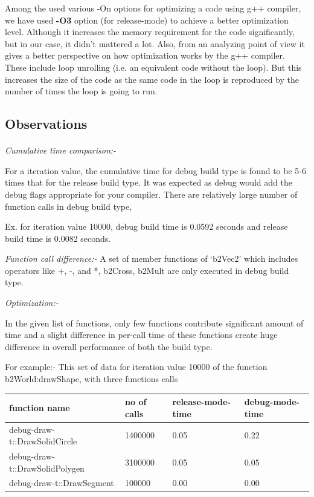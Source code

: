 \documentclass[11pt]{article}
\begin{document}
Among the used various -On options for optimizing a code using g++ compiler, we have used \textbf{-O3} option 
(for release-mode) to achieve a better optimization level. Although it increases the 
memory requirement for the code significantly, but 
in our case, it didn't mattered a lot. Also, from an analyzing point of view it gives a better perspective on 
how optimization works by the g++ compiler. These include loop unrolling (i.e. an equivalent code without the loop). 
But this increases the size of the code as the same code in the loop is reproduced by the number of times the loop
is going to run.

\subsection{Observations}
\paragraph{}
\textit{Cumulative time comparison:-}


For a iteration value, the cumulative time for debug build type is found to be 5-6 times that for the release build type.
 It was expected as debug would add the debug flags appropriate for your compiler. 
 There are relatively large number of function calls in debug build type,

Ex. for iteration value 10000, debug build time is 0.0592 seconds and release build time is 0.0082 seconds.

\setlength{\parskip}{10pt plus 1pt}
\textit{Function call difference:-}
A set of member functions of ‘b2Vec2’ which includes operators like +, -, and *, b2Cross, b2Mult 
are only executed in debug build type. 

\setlength{\parskip}{10pt plus 1pt}
\textit{Optimization:-}

In the given list of functions, only few functions contribute significant amount of time and a slight difference
 in per-call time of these functions create huge difference in overall performance of both the build type.

For example:- This set of data for iteration value 10000 of the function 
b2World:drawShape, with three functions calls 

\setlength{\parskip}{10pt plus 1pt}

\begin{tabular}{ | l | l | l | l |}
	\hline
  function name  & no of calls & release-mode-time & debug-mode-time \\ \hline
  debug-draw-t::DrawSolidCircle & 1400000 & 0.05 & 0.22 \\ \hline
  debug-draw-t::DrawSolidPolygen & 3100000 & 0.05 & 0.05 \\ \hline
  debug-draw-t::DrawSegment & 100000 & 0.00 & 0.00 \\ \hline
\end{tabular}
\end{document}
